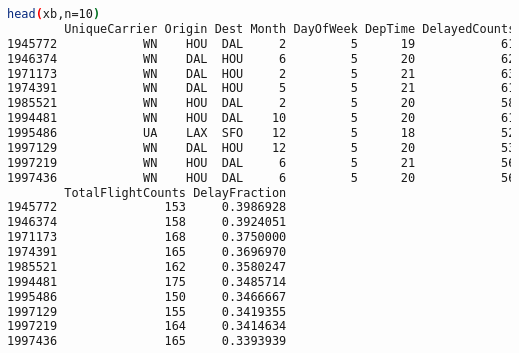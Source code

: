 \documentclass{article}\usepackage[]{graphicx}\usepackage[]{color}
\begin{document}
\begin{lstlisting}[language=bash,caption={Flight Delay (Top 10)}]
head(xb,n=10)
        UniqueCarrier Origin Dest Month DayOfWeek DepTime DelayedCounts
1945772            WN    HOU  DAL     2         5      19            61
1946374            WN    DAL  HOU     6         5      20            62
1971173            WN    DAL  HOU     2         5      21            63
1974391            WN    DAL  HOU     5         5      21            61
1985521            WN    HOU  DAL     2         5      20            58
1994481            WN    HOU  DAL    10         5      20            61
1995486            UA    LAX  SFO    12         5      18            52
1997129            WN    DAL  HOU    12         5      20            53
1997219            WN    HOU  DAL     6         5      21            56
1997436            WN    HOU  DAL     6         5      20            56
        TotalFlightCounts DelayFraction
1945772               153     0.3986928
1946374               158     0.3924051
1971173               168     0.3750000
1974391               165     0.3696970
1985521               162     0.3580247
1994481               175     0.3485714
1995486               150     0.3466667
1997129               155     0.3419355
1997219               164     0.3414634
1997436               165     0.3393939


\end{lstlisting}
\end{document}
